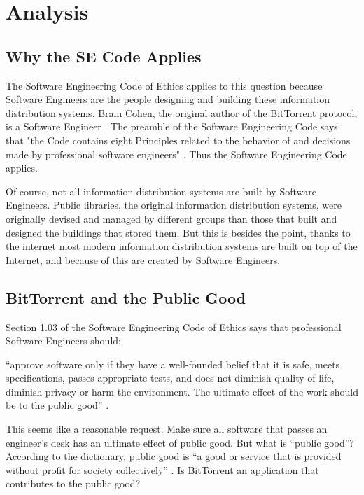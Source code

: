 \documentclass[11pt]{article}
\begin{document}
\section{Analysis}

\subsection{Why the SE Code Applies}

The Software Engineering Code of Ethics applies to this question because Software Engineers are the people designing and building these information distribution systems. Bram Cohen, the original author of the BitTorrent protocol, is a Software Engineer \cite{cohen}. The preamble of the Software Engineering Code says that "the Code contains eight Principles related to the behavior of and decisions made by professional software engineers" \cite{secode}. Thus the Software Engineering Code applies.

Of course, not all information distribution systems are built by Software Engineers. Public libraries, the original information distribution systems, were originally devised and managed by different groups than those that built and designed the buildings that stored them. But this is besides the point, thanks to the internet most modern information distribution systems are built on top of the Internet, and because of this are created by Software Engineers.

\subsection{BitTorrent and the Public Good}

Section 1.03 of the Software Engineering Code of Ethics says that professional Software Engineers should:

{\addtolength{\leftskip}{6mm}

\noindent``approve software only if they have a well-founded belief that it is safe, meets specifications, passes appropriate tests, and does not diminish quality of life, diminish privacy or harm the environment. The ultimate effect of the work should be to the public good'' \cite[1.03]{secode}.

}

This seems like a reasonable request. Make sure all software that passes an engineer's desk has an ultimate effect of public good. But what is ``public good''? According to the dictionary, public good is ``a good or service that is provided without profit for society collectively'' \cite{pubgooddef}. Is BitTorrent an application that contributes to the public good?
\end{document}

